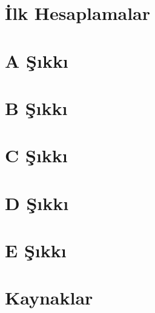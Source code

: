 \documentclass[a4paper,12pt]{article}
\begin{document}


\section{İlk Hesaplamalar}





\section{A Şıkkı}



\section{B Şıkkı}



\section{C Şıkkı}



\section{D Şıkkı}



\section{E Şıkkı}



\section{Kaynaklar}


\end{document}
